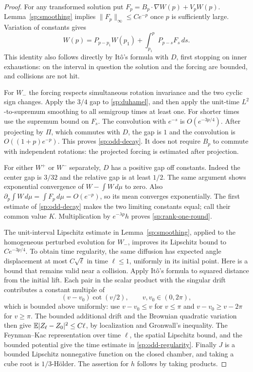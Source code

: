 \begin{proof}
For any transformed solution put
$F_p=B_p\cdot\nabla W(p)+V_pW(p)$.
Lemma~\ref{sp:smoothing} implies $\|F_p\|_\infty\le Ce^{-p}$
once $p$ is sufficiently large.  Variation of constants gives
\begin{equation}\label{sp:duhamel}
 W(p)=P_{p-p_1}W(p_1)+\int_{p_1}^pP_{p-s}F_s\,ds.
\end{equation}
This identity also follows directly by It\^o's formula with $D$,
first stopping on inner exhaustions: on the interval in question
the solution and the forcing are bounded, and collisions are not hit.

For $W_-$ the forcing respects simultaneous rotation invariance and
the two cyclic sign changes.  Apply the $3/4$ gap to
\eqref{sp:duhamel}, and then apply the unit-time $L^2$-to-supremum
smoothing to all semigroup times at least one.  For shorter times
use the supremum bound on $F_s$.  The convolution with $e^{-s}$ is
$O(e^{-3p/4})$.  After projecting by $\Pi$, which commutes with $D$,
the gap is $1$ and the convolution is $O((1+p)e^{-p})$.
This proves \eqref{sp:odd-decay}.  It does not require $B_p$ to
commute with independent rotations: the projected forcing is
estimated after projection.

For either $W^+$ or $W^-$ separately, $D$ has a positive gap off
constants.  Indeed the center gap is $3/32$ and the relative gap is
at least $1/2$.  The same argument shows exponential convergence of
$W-\int W\,d\mu$ to zero.  Also
$\partial_p\int W\,d\mu=\int F_p\,d\mu=O(e^{-p})$, so its mean
converges exponentially.  The first estimate of
\eqref{sp:odd-decay} makes the two limiting constants equal; call
their common value $K$.  Multiplication by $e^{-\lambda p}h$
proves \eqref{sp:rank-one-round}.

The unit-interval Lipschitz estimate in Lemma~\ref{sp:smoothing},
applied to the homogeneous perturbed evolution for $W_-$, improves
its Lipschitz bound to $Ce^{-3p/4}$.  To obtain time regularity,
the same diffusion has expected angle displacement at most
$C\sqrt\ell$ in time $\ell\le1$, uniformly in its initial point.
Here is a bound that remains valid near a collision.  Apply It\^o's
formula to squared distance from the initial lift.  Each pair in
the scalar product with the singular drift contributes a constant
multiple of
\[
 (v-v_0)\cot(v/2),\qquad v,v_0\in(0,2\pi),
\]
which is bounded above uniformly: use $v-v_0\le v$ for $v\le\pi$
and $v-v_0\ge v-2\pi$ for $v\ge\pi$.
The bounded additional drift and the Brownian quadratic variation
then give $\mathbb E|Z_\ell-Z_0|^2\le C\ell$, by localization and
Gronwall's inequality.  The Feynman--Kac representation over time
$\ell$, the spatial Lipschitz bound, and the bounded potential give
the time estimate in \eqref{sp:odd-regularity}.
Finally $J$ is a bounded Lipschitz nonnegative function on the closed
chamber, and taking a cube root is $1/3$-H\"older.  The assertion
for $h$ follows by taking products.
\end{proof}
